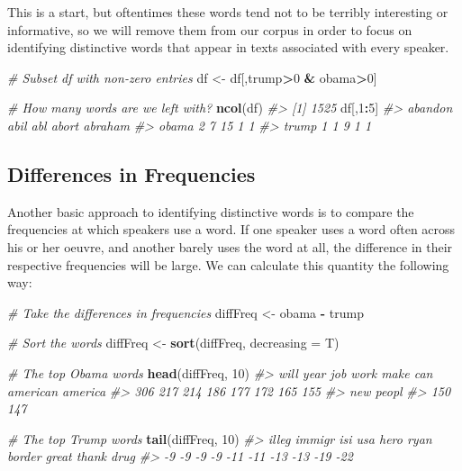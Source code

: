 \documentclass[]{book}
\newenvironment{Shaded}{\begin{snugshade}}{\end{snugshade}}
\newcommand{\KeywordTok}[1]{\textcolor[rgb]{0.13,0.29,0.53}{\textbf{#1}}}
\newcommand{\DataTypeTok}[1]{\textcolor[rgb]{0.13,0.29,0.53}{#1}}
\newcommand{\DecValTok}[1]{\textcolor[rgb]{0.00,0.00,0.81}{#1}}
\newcommand{\StringTok}[1]{\textcolor[rgb]{0.31,0.60,0.02}{#1}}
\newcommand{\CommentTok}[1]{\textcolor[rgb]{0.56,0.35,0.01}{\textit{#1}}}
\newcommand{\OperatorTok}[1]{\textcolor[rgb]{0.81,0.36,0.00}{\textbf{#1}}}
\newcommand{\NormalTok}[1]{#1}
\begin{document}
This is a start, but oftentimes these words tend not to be terribly
interesting or informative, so we will remove them from our corpus in
order to focus on identifying distinctive words that appear in texts
associated with every speaker.

\begin{Shaded}
\begin{Highlighting}[]
\CommentTok{# Subset df with non-zero entries}
\NormalTok{df <-}\StringTok{ }\NormalTok{df[,trump}\OperatorTok{>}\DecValTok{0} \OperatorTok{&}\StringTok{ }\NormalTok{obama}\OperatorTok{>}\DecValTok{0}\NormalTok{]}

\CommentTok{# How many words are we left with?}
\KeywordTok{ncol}\NormalTok{(df)}
\CommentTok{#> [1] 1525}
\NormalTok{df[,}\DecValTok{1}\OperatorTok{:}\DecValTok{5}\NormalTok{]}
\CommentTok{#>       abandon abil abl abort abraham}
\CommentTok{#> obama       2    7  15     1       1}
\CommentTok{#> trump       1    1   9     1       1}
\end{Highlighting}
\end{Shaded}

\subsection{Differences in
Frequencies}\label{differences-in-frequencies}

Another basic approach to identifying distinctive words is to compare
the frequencies at which speakers use a word. If one speaker uses a word
often across his or her oeuvre, and another barely uses the word at all,
the difference in their respective frequencies will be large. We can
calculate this quantity the following way:

\begin{Shaded}
\begin{Highlighting}[]
\CommentTok{# Take the differences in frequencies}
\NormalTok{diffFreq <-}\StringTok{ }\NormalTok{obama }\OperatorTok{-}\StringTok{ }\NormalTok{trump}

\CommentTok{# Sort the words}
\NormalTok{diffFreq <-}\StringTok{ }\KeywordTok{sort}\NormalTok{(diffFreq, }\DataTypeTok{decreasing =}\NormalTok{ T)}

\CommentTok{# The top Obama words}
\KeywordTok{head}\NormalTok{(diffFreq, }\DecValTok{10}\NormalTok{)}
\CommentTok{#>     will     year      job     work     make      can american  america }
\CommentTok{#>      306      217      214      186      177      172      165      155 }
\CommentTok{#>      new    peopl }
\CommentTok{#>      150      147}

\CommentTok{# The top Trump words}
\KeywordTok{tail}\NormalTok{(diffFreq, }\DecValTok{10}\NormalTok{)}
\CommentTok{#>  illeg immigr    isi    usa   hero   ryan border  great  thank   drug }
\CommentTok{#>     -9     -9     -9     -9    -11    -11    -13    -13    -19    -22}
\end{Highlighting}
\end{Shaded}
\end{document}
